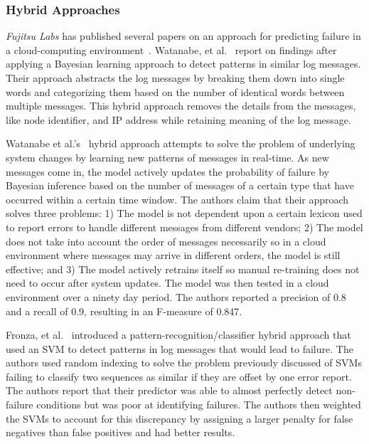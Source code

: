 \subsubsection{Hybrid Approaches}
\emph{Fujitsu Labs} has published several papers on an approach for predicting
failure in a cloud-computing
environment~\cite{sonoda2012,watanabe2012,watanabe2014}.  Watanabe, et
al.~\cite{watanabe2014, watanabe2012} report on findings after applying a
Bayesian learning approach to detect patterns in similar log messages.  Their
approach abstracts the log messages by breaking them down into single words and
categorizing them based on the number of identical words between multiple
messages.  This hybrid approach removes the details from the messages, like
node identifier, and \ac{IP} address while retaining meaning of the log
message.

Watanabe et al.'s~\cite{watanabe2014} hybrid approach attempts to solve the
problem of underlying system changes by learning new patterns of messages in
real-time.  As new messages come in, the model actively updates the probability
of failure by Bayesian inference based on the number of messages of a certain
type that have occurred within a certain time window.  The authors claim that
their approach solves three problems: 1)  The model is not dependent upon a
certain lexicon used to report errors to handle different messages from
different vendors; 2) The model does not take into account the order of
messages necessarily so in a cloud environment where messages may arrive in
different orders, the model is still effective; and 3)  The model actively
retrains itself so manual re-training does not need to occur after system
updates.  The model was then tested in a cloud environment over a ninety day
period.  The authors reported a precision of 0.8 and a recall of 0.9, resulting
in an F-measure of 0.847.  

Fronza, et al.~\cite{fronza2013} introduced a pattern-recognition/classifier
hybrid approach that used an \ac{SVM} to detect patterns in log messages that
would lead to failure.  The authors used random indexing to solve the problem
previously discussed of \ac{SVM}s failing to classify two sequences as similar
if they are offset by one error report.  The authors report that their
predictor was able to almost perfectly detect non-failure conditions but was
poor at identifying failures.  The authors then weighted the \ac{SVM}s to
account for this discrepancy by assigning a larger penalty for false negatives
than false positives and had better results.

